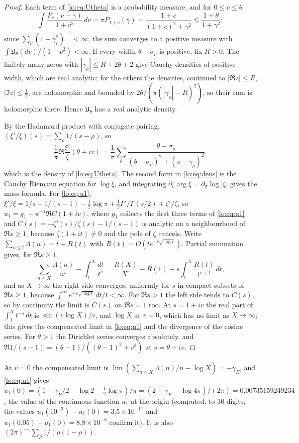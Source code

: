 \begin{proof}
Each term of \eqref{lo:eq:Utheta} is a probability measure, and for $0\le c\le\theta$
\[
\int\frac{P_c(v-\gamma)}{1+v^2}\,dv=\pi P_{1+c}(\gamma)=\frac{1+c}{(1+c)^2+\gamma^2}\le\frac{1+\theta}{1+\gamma^2};
\]
since $\sum_\rho(1+\gamma_\rho^2)^{-1}<\infty$, the sum converges to a positive measure with $\int\mathfrak U_\theta(dv)/(1+v^2)<\infty$. If every width $\theta-\sigma_\rho$ is positive, fix $R>0$. The finitely many zeros with $|\gamma_\rho|\le R+2\theta+2$ give Cauchy densities of positive width, which are real analytic; for the others the densities, continued to $|\Re z|\le R$, $|\Im z|\le\tfrac12$, are holomorphic and bounded by $2\theta/(\pi(|\gamma_\rho|-R)^2)$, so their sum is holomorphic there. Hence $\mathfrak U_\theta$ has a real analytic density.

By the Hadamard product with conjugate pairing, $(\xi'/\xi)(s)=\sum_\rho1/(s-\rho)$, so
\[
\frac1\pi\Re\frac{\xi'}{\xi}(\theta+iv)=\frac1\pi\sum_\rho\frac{\theta-\sigma_\rho}{(\theta-\sigma_\rho)^2+(v-\gamma_\rho)^2},
\]
which is the density of \eqref{lo:eq:Utheta}. The second form in \eqref{lo:eq:dens} is the Cauchy Riemann equation for $\log\xi$, and integrating $\partial_v\arg\xi=\partial_\sigma\log|\xi|$ gives the mass formula. For \eqref{lo:eq:u1}, $\xi'/\xi=1/s+1/(s-1)-\tfrac12\log\pi+\tfrac12\Gamma'/\Gamma(s/2)+\zeta'/\zeta$, so $u_1=g_1-\pi^{-1}\Re C(1+iv)$, where $g_1$ collects the first three terms of \eqref{lo:eq:u1} and $C(s)=-\zeta'(s)/\zeta(s)-1/(s-1)$ is analytic on a neighbourhood of $\Re s\ge1$, because $\zeta(1+it)\ne0$ and the pole of $\zeta$ cancels. Write $\sum_{n\le t}\Lambda(n)=t+R(t)$ with $R(t)=O(te^{-c\sqrt{\log t}})$. Partial summation gives, for $\Re s\ge1$,
\[
\sum_{n\le X}\frac{\Lambda(n)}{n^s}-\int_1^X\frac{dt}{t^s}=\frac{R(X)}{X^s}-R(1)+s\int_1^X\frac{R(t)}{t^{s+1}}\,dt ,
\]
and as $X\to\infty$ the right side converges, uniformly for $s$ in compact subsets of $\Re s\ge1$, because $\int^\infty e^{-c\sqrt{\log t}}\,dt/t<\infty$. For $\Re s>1$ the left side tends to $C(s)$, so by continuity the limit is $C(s)$ on $\Re s=1$ too. At $s=1+iv$ the real part of $\int_1^Xt^{-s}\,dt$ is $\sin(v\log X)/v$, and $\log X$ at $v=0$, which has no limit as $X\to\infty$; this gives the compensated limit in \eqref{lo:eq:u1} and the divergence of the cosine series. For $\theta>1$ the Dirichlet series converges absolutely, and $\Re1/(s-1)=(\theta-1)/((\theta-1)^2+v^2)$ at $s=\theta+iv$.
\end{proof}

At $v=0$ the compensated limit is $\lim(\sum_{n\le X}\Lambda(n)/n-\log X)=-\gamma_E$, and \eqref{lo:eq:u1} gives $u_1(0)=(1+\gamma_E/2-\log2-\tfrac12\log\pi)/\pi=(2+\gamma_E-\log4\pi)/(2\pi)=0.00735159249234$, the value of the continuous function $u_1$ at the origin (computed, to $30$ digits; the values $u_1(10^{-3})-u_1(0)=3.5\times10^{-11}$ and $u_1(0.05)-u_1(0)=8.8\times10^{-8}$ confirm it). It is also $(2\pi)^{-1}\sum_\rho1/(\rho(1-\rho))$.

